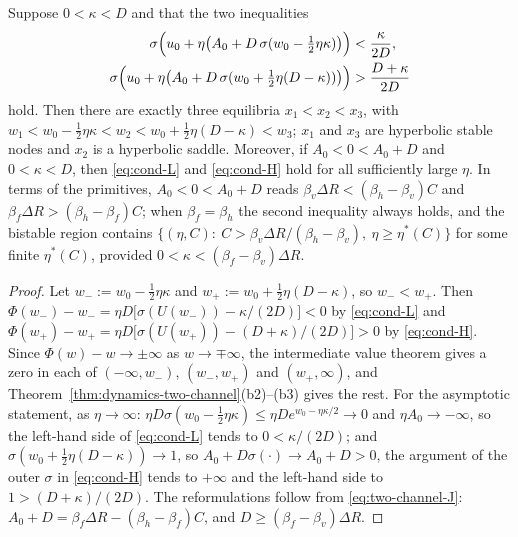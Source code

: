 \begin{proposition}[Bistability]\label{prop:bistability}
Suppose $0<\kappa<D$ and that the two inequalities
\begin{align}
\sigma\Bigl(u_0+\eta\bigl(A_0+D\,\sigma(w_0-\tfrac12\eta\kappa)\bigr)\Bigr)&<\frac{\kappa}{2D},
\label{eq:cond-L}\\
\sigma\Bigl(u_0+\eta\bigl(A_0+D\,\sigma(w_0+\tfrac12\eta(D-\kappa))\bigr)\Bigr)&>\frac{D+\kappa}{2D}
\label{eq:cond-H}
\end{align}
hold. Then there are exactly three equilibria $x_1<x_2<x_3$, with
$w_1<w_0-\frac12\eta\kappa<w_2<w_0+\frac12\eta(D-\kappa)<w_3$; $x_1$ and
$x_3$ are hyperbolic stable nodes and $x_2$ is a hyperbolic saddle.
Moreover, if $A_0<0<A_0+D$ and $0<\kappa<D$, then \eqref{eq:cond-L} and
\eqref{eq:cond-H} hold for all sufficiently large $\eta$. In terms of the
primitives, $A_0<0<A_0+D$ reads
$\beta_v\Delta R<(\beta_h-\beta_v)C$ and
$\beta_f\Delta R>(\beta_h-\beta_f)C$; when $\beta_f=\beta_h$ the second
inequality always holds, and the bistable region contains
$\{(\eta,C):\ C>\beta_v\Delta R/(\beta_h-\beta_v),\ \eta\ge\eta^\ast(C)\}$
for some finite $\eta^\ast(C)$, provided $0<\kappa<(\beta_f-\beta_v)\Delta R$.
\end{proposition}

\begin{proof}
Let $w_-:=w_0-\frac12\eta\kappa$ and $w_+:=w_0+\frac12\eta(D-\kappa)$, so
$w_-<w_+$. Then
$\Phi(w_-)-w_-=\eta D\bigl[\sigma(U(w_-))-\kappa/(2D)\bigr]<0$ by
\eqref{eq:cond-L} and
$\Phi(w_+)-w_+=\eta D\bigl[\sigma(U(w_+))-(D+\kappa)/(2D)\bigr]>0$ by
\eqref{eq:cond-H}. Since $\Phi(w)-w\to\pm\infty$ as $w\to\mp\infty$, the
intermediate value theorem gives a zero in each of $(-\infty,w_-)$,
$(w_-,w_+)$ and $(w_+,\infty)$, and
Theorem~\ref{thm:dynamics-two-channel}(b2)--(b3) gives the rest. For the
asymptotic statement, as $\eta\to\infty$:
$\eta D\sigma(w_0-\frac12\eta\kappa)\le\eta De^{w_0-\eta\kappa/2}\to0$ and
$\eta A_0\to-\infty$, so the left-hand side of \eqref{eq:cond-L} tends to
$0<\kappa/(2D)$; and $\sigma(w_0+\frac12\eta(D-\kappa))\to1$, so
$A_0+D\sigma(\cdot)\to A_0+D>0$, the argument of the outer $\sigma$ in
\eqref{eq:cond-H} tends to $+\infty$ and the left-hand side to
$1>(D+\kappa)/(2D)$. The reformulations follow from
\eqref{eq:two-channel-J}: $A_0+D=\beta_f\Delta R-(\beta_h-\beta_f)C$, and
$D\ge(\beta_f-\beta_v)\Delta R$.
\end{proof}

